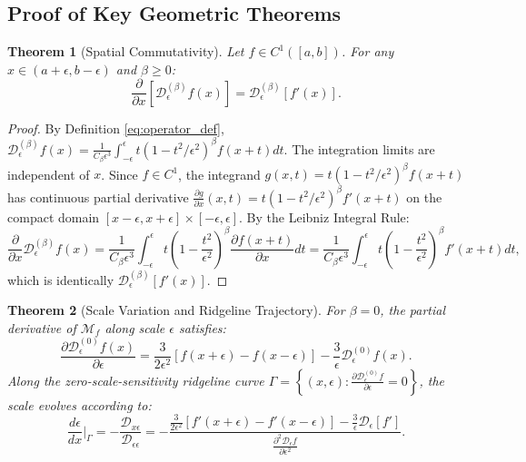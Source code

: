 \documentclass[11pt,a4paper]{article}
\newtheorem{theorem}{Theorem}
\theoremstyle{definition}
\begin{document}
\subsection{Proof of Key Geometric Theorems}

\begin{theorem}[Spatial Commutativity]
\label{thm:commutativity_formal}
Let $f \in C^1([a, b])$. For any $x \in (a+\epsilon, b-\epsilon)$ and $\beta \ge 0$:
\begin{equation}
\frac{\partial}{\partial x} \left[ \mathcal{D}_\epsilon^{(\beta)} f(x) \right] = \mathcal{D}_\epsilon^{(\beta)} \left[ f'(x) \right].
\end{equation}
\end{theorem}

\begin{proof}
By Definition \ref{eq:operator_def}, $\mathcal{D}_\epsilon^{(\beta)} f(x) = \frac{1}{C_\beta \epsilon^3} \int_{-\epsilon}^\epsilon t (1 - t^2/\epsilon^2)^\beta f(x + t) dt$. The integration limits are independent of $x$. Since $f \in C^1$, the integrand $g(x, t) = t (1 - t^2/\epsilon^2)^\beta f(x + t)$ has continuous partial derivative $\frac{\partial g}{\partial x}(x, t) = t (1 - t^2/\epsilon^2)^\beta f'(x + t)$ on the compact domain $[x-\epsilon, x+\epsilon] \times [-\epsilon, \epsilon]$. By the Leibniz Integral Rule:
\begin{equation}
\frac{\partial}{\partial x} \mathcal{D}_\epsilon^{(\beta)} f(x) = \frac{1}{C_\beta \epsilon^3} \int_{-\epsilon}^\epsilon t \left(1 - \frac{t^2}{\epsilon^2}\right)^\beta \frac{\partial f(x+t)}{\partial x} dt = \frac{1}{C_\beta \epsilon^3} \int_{-\epsilon}^\epsilon t \left(1 - \frac{t^2}{\epsilon^2}\right)^\beta f'(x+t) dt,
\end{equation}
which is identically $\mathcal{D}_\epsilon^{(\beta)} [f'(x)]$.
\end{proof}

\begin{theorem}[Scale Variation and Ridgeline Trajectory]
\label{thm:scale_variation_formal}
For $\beta = 0$, the partial derivative of $\mathcal{M}_f$ along scale $\epsilon$ satisfies:
\begin{equation}
\frac{\partial \mathcal{D}_\epsilon^{(0)} f(x)}{\partial \epsilon} = \frac{3}{2\epsilon^2} \left[ f(x + \epsilon) - f(x - \epsilon) \right] - \frac{3}{\epsilon} \mathcal{D}_\epsilon^{(0)} f(x).
\label{eq:scale_deriv_exact}
\end{equation}
Along the zero-scale-sensitivity ridgeline curve $\Gamma = \left\{(x, \epsilon) : \frac{\partial \mathcal{D}_\epsilon^{(0)} f}{\partial \epsilon} = 0\right\}$, the scale evolves according to:
\begin{equation}
\frac{d\epsilon}{dx}\bigg|_\Gamma = -\frac{\mathcal{D}_{x\epsilon}}{\mathcal{D}_{\epsilon\epsilon}} = -\frac{\frac{3}{2\epsilon^2}[f'(x+\epsilon) - f'(x-\epsilon)] - \frac{3}{\epsilon}\mathcal{D}_\epsilon[f']}{\frac{\partial^2 \mathcal{D}_\epsilon f}{\partial \epsilon^2}}.
\label{eq:ridgeline_ode}
\end{equation}
\end{theorem}
\end{document}
